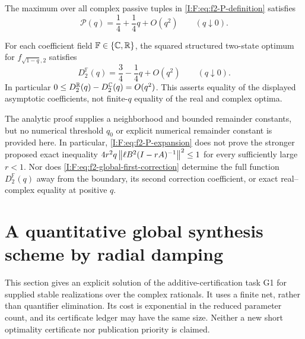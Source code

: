 \begin{theorem}
\label{I:F:thm:f2-passive-asymptotic}
The maximum over all complex passive tuples in
\eqref{I:F:eq:f2-P-definition} satisfies
\begin{equation}
 \mathcal P(q)=\frac14+\frac14q+O(q^2)
 \qquad(q\downarrow0).
 \label{I:F:eq:f2-P-expansion}
\end{equation}
\end{theorem}



\begin{theorem}
\label{I:F:thm:f2-global-first-correction}
For each coefficient field $\mathbb F\in\{\mathbb C,\mathbb R\}$, the squared
structured two-state optimum for $f_{\sqrt{1-q},2}$ satisfies
\begin{equation}
 \boxed{\displaystyle
 D_2^{\mathbb F}(q)=\frac34-\frac14q+O(q^2)
 \qquad(q\downarrow0).}
 \label{I:F:eq:f2-global-first-correction}
\end{equation}
In particular
$0\le D_2^{\mathbb R}(q)-D_2^{\mathbb C}(q)=O(q^2)$.
This asserts equality of the displayed asymptotic coefficients, not
finite-$q$ equality of the real and complex optima.
\end{theorem}



The analytic proof supplies a neighborhood and bounded remainder
constants, but no numerical threshold $q_0$ or explicit numerical
remainder constant is provided here.  In particular,
\eqref{I:F:eq:f2-P-expansion} does not prove the stronger proposed exact
inequality $4r^2q\left\lVert\ell B^2(I-rA)^{-1}\right\rVert^2\le1$ for every sufficiently
large $r<1$.  Nor does \eqref{I:F:eq:f2-global-first-correction} determine the
full function $D_2^{\mathbb F}(q)$ away from the boundary, its second
correction coefficient, or exact real--complex equality at positive
$q$.

\section{A quantitative global synthesis scheme by radial damping}
\label{I:F:sec:g1-damping}

This section gives an explicit solution of the additive-certification task G1
for supplied stable realizations over the complex rationals. It uses a finite
net, rather than quantifier elimination. Its cost is exponential in the
reduced parameter count, and its certificate ledger may have the same size.
Neither a new short optimality certificate nor publication priority is claimed.


